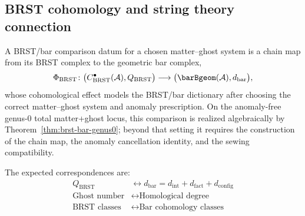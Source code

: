 \subsection{BRST cohomology and string theory connection}

\begin{conjecture}\label{conj:brst-cohomology}
A BRST/bar comparison datum for a chosen matter--ghost system is a
chain map from its BRST complex to the geometric bar complex,
\[
\Phi_{\mathrm{BRST}} \colon
\bigl(C^\bullet_{\mathrm{BRST}}(\mathcal{A}), Q_{\mathrm{BRST}}\bigr)
\longrightarrow
\bigl(\barBgeom(\mathcal{A}), d_{\mathrm{bar}}\bigr),
\]
whose cohomological effect models the BRST/bar dictionary after
choosing the correct matter--ghost system and anomaly
prescription. On the anomaly-free genus-$0$ total
matter+ghost locus, this comparison is realized algebraically by
Theorem~\ref{thm:brst-bar-genus0}; beyond that setting it
requires the construction of the chain map, the anomaly cancellation
identity, and the sewing compatibility.

The expected correspondences are:
\begin{align}
Q_{\text{BRST}} &\leftrightarrow d_{\text{bar}} = d_{\text{int}} + d_{\text{fact}} + d_{\text{config}} \\
\text{Ghost number} &\leftrightarrow \text{Homological degree} \\
\text{BRST classes} &\leftrightarrow \text{Bar cohomology classes}
\end{align}
\end{conjecture}

